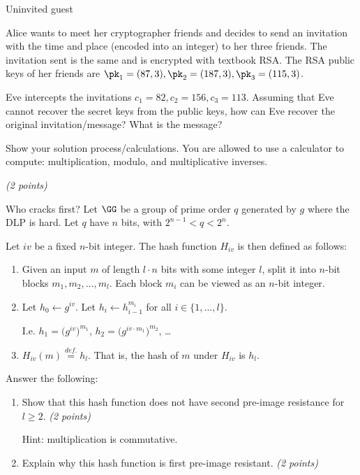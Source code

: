 \documentclass{homework}
\begin{document}
\begin{task}{Uninvited guest}

  Alice wants to meet her cryptographer friends and decides to send an invitation with the time and place (encoded into an integer) to her three friends.
  The invitation sent is the same and is encrypted with textbook RSA.
  The RSA public keys of her friends are $\pk_1 = (87, 3), \pk_2 = (187, 3), \pk_3 = (115,3)$.

  Eve intercepts the invitations $c_1 = 82, c_2 = 156, c_3 = 113$.
  Assuming that Eve cannot recover the secret keys from the public keys, how can Eve recover the original invitation/message?
  What is the message?

  Show your solution process/calculations.
  You are allowed to use a calculator to compute: multiplication, modulo, and multiplicative inverses.

  \textit{(2 points)}
\end{task}

\newpage

\begin{task}{Who cracks first?}
  Let $\GG$ be a group of prime order $q$ generated by $g$ where the DLP is hard.
  Let $q$ have $n$ bits, with $2^{n-1} < q < 2^n$.

  Let $\mathit{iv}$ be a fixed $n$-bit integer.
  The hash function $H_{\mathit{iv}}$ is then defined as follows:
  \begin{enumerate}
    \item Given an input $m$ of length $l\cdot n$ bits with some integer $l$, split it into $n$-bit blocks $m_1, m_2, \dots, m_l$.
    Each block $𝑚_i$ can be viewed as an $n$-bit integer.
    \item Let $h_0 \gets g^{\mathit{iv}}$.
    Let $h_i \gets h^{m_i}_{i-1}$ for all $i\in\{1,\dots,l\}$.

    I.e. $h_1 = \bigl(g^{\mathit{iv}}\bigr)^{m_1}$, $h_2 = \bigl(g^{\mathit{iv} \cdot m_1}\bigr)^{m_2}$, \dots
    \item $H_{\mathit{iv}}(m) \overset{\mathit{def.}}{=} h_l$.
    That is, the hash of $m$ under $H_{\mathit{iv}}$ is $h_l$.
  \end{enumerate}

  Answer the following:

  \begin{enumerate}
    \item Show that this hash function does not have second pre-image resistance for $l \ge 2$.
    \textit{(2 points)}

    Hint: multiplication is commutative.

    \item Explain why this hash function is first pre-image resistant.
    \textit{(2 points)}
  \end{enumerate}
\end{task}
\end{document}

